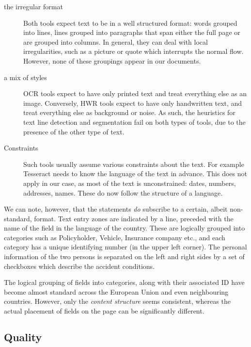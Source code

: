 	\begin{description}
		\item[the irregular format] Both tools expect text to be in a well structured format: words grouped into lines, lines grouped into paragraphs that span either the full page or are grouped into columns. In general, they can deal with local irregularities, such as a picture or quote which interrupts the normal flow. However, none of these groupings appear in our documents.

		\item[a mix of styles] OCR tools expect to have only printed text and treat everything else as an image. Conversely, HWR tools expect to have only handwritten text, and treat everything else as background or noise. As such, the heuristics for text line detection and segmentation fail on both types of tools, due to the presence of the other type of text.

		\item[Constraints] Such tools usually assume various constraints about the text. For example Tesseract needs to know the language of the text in advance. This does not apply in our case, as most of the text is unconstrained: dates, numbers, addresses, names. These do now follow the structure of a language.
	\end{description}

	We can note, however, that the statements \emph{do} subscribe to a certain, albeit non-standard, format. Text entry zones are indicated by a line, preceded with the name of the field in the language of the country. These are logically grouped into categories such as Policyholder, Vehicle, Insurance company etc., and each category has a unique identifying number (in the upper left corner). The personal information of the two persons is separated on the left and right sides by a set of checkboxes which describe the accident conditions.

	The logical grouping of fields into categories, along with their associated ID have become almost standard across the European Union and even neighbouring countries. However, only the \emph{content structure} seems consistent, whereas the actual placement of fields on the page can be significantly different.




\subsection{Quality}

